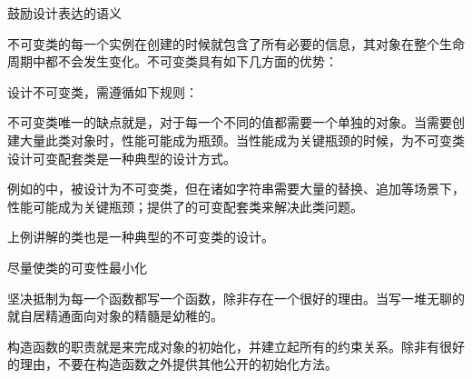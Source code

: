 \begin{content}

\begin{advise}
鼓励设计表达的语义
\end{advise}

不可变类的每一个实例在创建的时候就包含了所有必要的信息，其对象在整个生命周期中都不会发生变化。不可变类具有如下几方面的优势：
\begin{enum}
\end{enum}

设计不可变类，需遵循如下规则：
\begin{enum}
\end{enum}

不可变类唯一的缺点就是，对于每一个不同的值都需要一个单独的对象。当需要创建大量此类对象时，性能可能成为瓶颈。当性能成为关键瓶颈的时候，为不可变类设计可变配套类是一种典型的设计方式。

例如的中，被设计为不可变类，但在诸如字符串需要大量的替换、追加等场景下，性能可能成为关键瓶颈；提供了的可变配套类来解决此类问题。

上例讲解的类也是一种典型的不可变类的设计。

\begin{regulation}
尽量使类的可变性最小化
\end{regulation}

坚决抵制为每一个函数都写一个函数，除非存在一个很好的理由。当写一堆无聊的就自居精通面向对象的精髓是幼稚的。

构造函数的职责就是来完成对象的初始化，并建立起所有的约束关系。除非有很好的理由，不要在构造函数之外提供其他公开的初始化方法。

\end{content}

